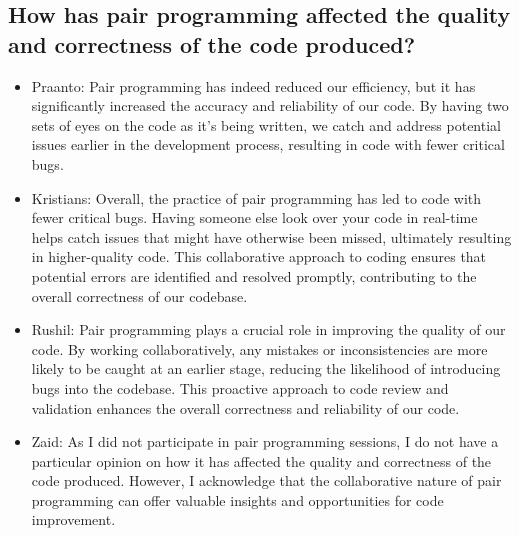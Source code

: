 \subsection{How has pair programming affected the quality and correctness of the code produced?}
\begin{itemize}
    \item Praanto: Pair programming has indeed reduced our efficiency, but it has significantly increased the accuracy and reliability of our code. By having two sets of eyes on the code as it's being written, we catch and address potential issues earlier in the development process, resulting in code with fewer critical bugs.
    \item Kristians: Overall, the practice of pair programming has led to code with fewer critical bugs. Having someone else look over your code in real-time helps catch issues that might have otherwise been missed, ultimately resulting in higher-quality code. This collaborative approach to coding ensures that potential errors are identified and resolved promptly, contributing to the overall correctness of our codebase.
    \item Rushil: Pair programming plays a crucial role in improving the quality of our code. By working collaboratively, any mistakes or inconsistencies are more likely to be caught at an earlier stage, reducing the likelihood of introducing bugs into the codebase. This proactive approach to code review and validation enhances the overall correctness and reliability of our code.
    \item Zaid: As I did not participate in pair programming sessions, I do not have a particular opinion on how it has affected the quality and correctness of the code produced. However, I acknowledge that the collaborative nature of pair programming can offer valuable insights and opportunities for code improvement.
\end{itemize}
